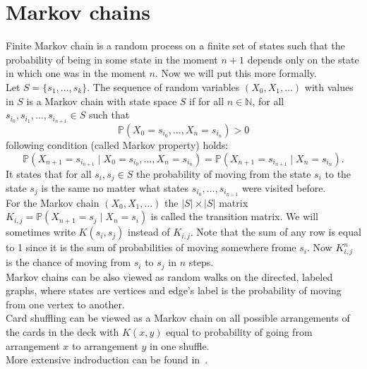 \documentclass[a4paper, 12pt]{article}
\begin{document}
\section{Markov chains}
\setcounter{page}{5}
Finite Markov chain is a random process on a finite set of states such that
the probability of being in some state in the moment $n+1$ depends only on the state in which one was
in the moment $n$. Now we will put this more formally.\\
Let $S = \{s_1, \dots, s_k\}$. The sequence of random variables $(X_0, X_1, \dots)$ with values in $S$
is a Markov chain with state space $S$ if for all $n \in \mathbb{N}$,
for all $s_{i_0}, s_{i_1}, \dots, s_{i_{n+1}} \in S$ such that
\begin{equation*}
\mathbb{P}(X_0 = s_{i_0}, \dots, X_n = s_{i_n}) > 0
\end{equation*}
following condition (called Markov property) holds:
\begin{equation}
\mathbb{P}(X_{n+1} = s_{i_{n+1}} \mid X_0 = s_{i_0}, \dots, X_n = s_{i_n}) =
\mathbb{P}(X_{n+1} = s_{i_{n+1}} \mid X_n = s_{i_n}).
\end{equation}
It states that for all $s_i, s_j \in S$ the probability of moving from the state
$s_i$ to the state $s_j$ is the same no matter what states $s_{i_0}, \dots, s_{i_{n-1}}$
were visited before. \\
For the Markov chain $(X_0, X_1, \dots)$ the $|S| \times |S|$ matrix
$K_{i,j} = \mathbb{P}(X_{n+1} = s_j \mid X_n = s_i)$ is called the transition matrix. We will sometimes
write $K(s_i, s_j)$ instead of $K_{i,j}$. Note that the sum of
any row is equal to 1 since it is the sum of probabilities of moving somewhere frome $s_i$.
Now $K^n_{i,j}$ is the chance of moving from $s_i$ to $s_j$ in $n$ steps. \\
Markov chains can be also viewed as random walks on the directed, labeled graphs, where states are vertices
and edge's label is the probability of moving from one vertex to another. \\
Card shuffling can be viewed as a Markov chain on all possible arrangements of the cards
in the deck with $K(x,y)$ equal to probability of going from arrangement $x$ to arrangement $y$ in one
shuffle.
\\ More extensive indroduction can be found in~\cite{LePeWi}. \\
\end{document}
